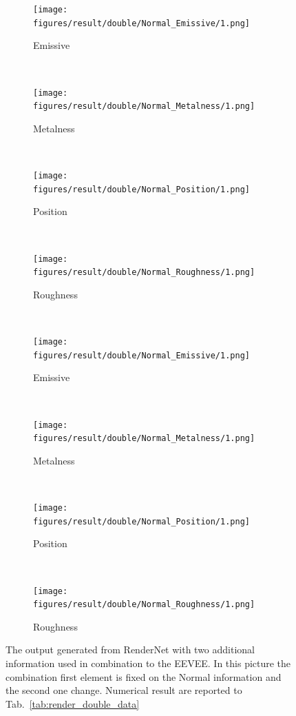 \begin{figure}[h!]
    \centering
    \begin{subfigure}[b]{0.175\textwidth}
     \texttt{[image: figures/result/double/Normal\_Emissive/1.png]}
     \caption{Emissive}\label{subfig:1}
    \end{subfigure}
    ~
    \begin{subfigure}[b]{0.175\textwidth}
     \texttt{[image: figures/result/double/Normal\_Metalness/1.png]}
     \caption{Metalness}
    \end{subfigure}
    ~
    \begin{subfigure}[b]{0.175\textwidth}
     \texttt{[image: figures/result/double/Normal\_Position/1.png]}
     \caption{Position}
    \end{subfigure}
    ~
    \begin{subfigure}[b]{0.175\textwidth}
     \texttt{[image: figures/result/double/Normal\_Roughness/1.png]}
     \caption{Roughness}
    \end{subfigure}
    \\ \vspace{0.2cm} %
    \begin{subfigure}[b]{0.175\textwidth}
     \texttt{[image: figures/result/double/Normal\_Emissive/1.png]}
     \caption{Emissive}\label{subfig:1}
    \end{subfigure}
    ~
    \begin{subfigure}[b]{0.175\textwidth}
     \texttt{[image: figures/result/double/Normal\_Metalness/1.png]}
     \caption{Metalness}
    \end{subfigure}
    ~
    \begin{subfigure}[b]{0.175\textwidth}
     \texttt{[image: figures/result/double/Normal\_Position/1.png]}
     \caption{Position}
    \end{subfigure}
    ~
    \begin{subfigure}[b]{0.175\textwidth}
     \texttt{[image: figures/result/double/Normal\_Roughness/1.png]}
     \caption{Roughness}
    \end{subfigure}
    \caption{The output generated from RenderNet with two additional information used in combination to the EEVEE. In this picture the combination first element is fixed on the Normal information and the second one change. Numerical result are reported to Tab.~\ref{tab:render_double_data}}
    \label{fig:double_input_base_normal_generation}
\end{figure}


